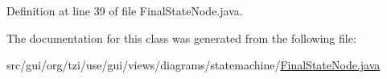 Definition at line 39 of file Final\-State\-Node.\-java.



The documentation for this class was generated from the following file\-:\begin{DoxyCompactItemize}
\item 
src/gui/org/tzi/use/gui/views/diagrams/statemachine/\hyperlink{_final_state_node_8java}{Final\-State\-Node.\-java}\end{DoxyCompactItemize}
